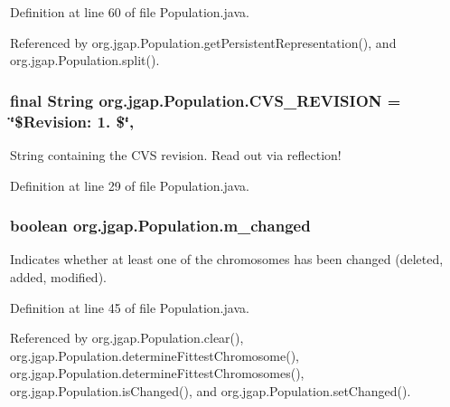 Definition at line 60 of file Population.\-java.



Referenced by org.\-jgap.\-Population.\-get\-Persistent\-Representation(), and org.\-jgap.\-Population.\-split().

\hypertarget{classorg_1_1jgap_1_1_population_a66404ad18ee170cbd1d4423aa0acec14}{
\subsubsection[{C\-V\-S\-\_\-\-R\-E\-V\-I\-S\-I\-O\-N}]{\setlength{\rightskip}{0pt plus 5cm}final String org.\-jgap.\-Population.\-C\-V\-S\-\_\-\-R\-E\-V\-I\-S\-I\-O\-N = \char`\"{}\$Revision\-: 1. \$\char`\"{}\hspace{0.3cm}{\ttfamily [static]}, {\ttfamily [private]}}}\label{classorg_1_1jgap_1_1_population_a66404ad18ee170cbd1d4423aa0acec14}
String containing the C\-V\-S revision. Read out via reflection! 

Definition at line 29 of file Population.\-java.

\hypertarget{classorg_1_1jgap_1_1_population_ade9e10d21203f65a3cf4c6385fd4eb76}{
\subsubsection[{m\-\_\-changed}]{\setlength{\rightskip}{0pt plus 5cm}boolean org.\-jgap.\-Population.\-m\-\_\-changed\hspace{0.3cm}{\ttfamily [private]}}}\label{classorg_1_1jgap_1_1_population_ade9e10d21203f65a3cf4c6385fd4eb76}
Indicates whether at least one of the chromosomes has been changed (deleted, added, modified). 

Definition at line 45 of file Population.\-java.



Referenced by org.\-jgap.\-Population.\-clear(), org.\-jgap.\-Population.\-determine\-Fittest\-Chromosome(), org.\-jgap.\-Population.\-determine\-Fittest\-Chromosomes(), org.\-jgap.\-Population.\-is\-Changed(), and org.\-jgap.\-Population.\-set\-Changed().

